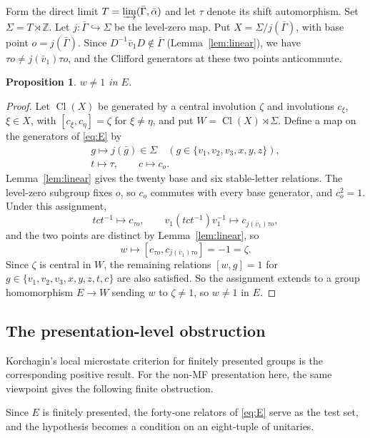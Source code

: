 \documentclass[11pt]{amsart}
\newcommand{\leanverified}[2]{\ignorespaces}
\newtheorem{proposition}[theorem]{Proposition}
\theoremstyle{definition}
\theoremstyle{remark}
\theoremstyle{plain}
\newcommand{\Cl}{\operatorname{Cl}}
\begin{document}
Form the direct limit $T=\varinjlim(\bar\Gamma,\bar\alpha)$ and let
$\tau$ denote its shift automorphism.  Set $\Sigma=T\rtimes\mathbb Z$.
Let $j\colon\bar\Gamma\hookrightarrow\Sigma$ be the level-zero map.  Put
$X=\Sigma/j(\bar\Gamma)$, with base point $o=j(\bar\Gamma)$.  Since
$D^{-1}\bar v_1D\notin\bar\Gamma$ (Lemma~\ref{lem:linear}), we have
$\tau o\ne j(\bar v_1)\tau o$, and the Clifford generators at these two
points anticommute.

\begin{proposition}\label{prop:witness}
$w\neq1$ in $E$.
\leanverified{Sofic/LiteralNonMFLinearWitness}{GroupApproximation.LiteralNonMFLinearWitness.literal_mark_ne_one}
\end{proposition}

\begin{proof}
Let $\Cl(X)$ be generated by a central involution $\zeta$ and involutions
$c_\xi$, $\xi\in X$, with
$[c_\xi,c_\eta]=\zeta$ for $\xi\ne\eta$, and put
$W=\Cl(X)\rtimes\Sigma$.
Define a map on the generators of \eqref{eq:E} by
\[
\begin{gathered}
  g\mapsto j(\bar g)\in\Sigma\quad
  (g\in\{v_1,v_2,v_3,x,y,z\}),\\
  t\mapsto\tau,\qquad c\mapsto c_o .
\end{gathered}
\]
Lemma~\ref{lem:linear} gives the twenty base and six stable-letter
relations.  The level-zero subgroup fixes $o$, so $c_o$
commutes with every base generator, and $c_o^2=1$.
Under this assignment,
\[
  tct^{-1}\mapsto c_{\tau o},\qquad
  v_1(tct^{-1})v_1^{-1}\mapsto c_{j(\bar v_1)\tau o},
\]
and the two points are distinct by Lemma~\ref{lem:linear}, so
\[
  w\mapsto[c_{\tau o},c_{j(\bar v_1)\tau o}]=-1=\zeta .
\]
Since $\zeta$ is central in $W$, the remaining relations $[w,g]=1$ for
$g\in\{v_1,v_2,v_3,x,y,z,t,c\}$ are also satisfied.  So the
assignment extends to a group homomorphism $E\to W$ sending $w$ to
$\zeta\neq1$, so $w\neq1$ in $E$.
\end{proof}

\subsection{The presentation-level obstruction}

Korchagin's local microstate criterion for finitely presented groups
\cite[Proposition~8]{Korchagin} is the corresponding positive result.
For the non-MF presentation here, the same viewpoint gives the following
finite obstruction.

Since $E$ is finitely presented, the forty-one relators of
\eqref{eq:E} serve as the test set, and the hypothesis becomes a
condition on an eight-tuple of unitaries.
\end{document}
